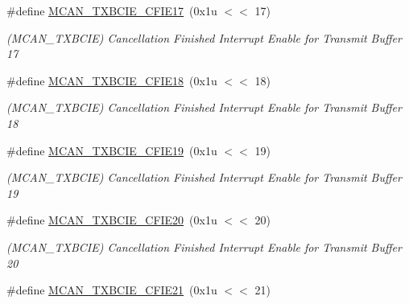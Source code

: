 \begin{DoxyCompactItemize}
\#define \mbox{\hyperlink{group__SAME70__MCAN_ga1066c22367c2c2d2e4db5fdca542deed}{M\+C\+A\+N\+\_\+\+T\+X\+B\+C\+I\+E\+\_\+\+C\+F\+I\+E17}}~(0x1u $<$$<$ 17)
\begin{DoxyCompactList}\small\item\em (M\+C\+A\+N\+\_\+\+T\+X\+B\+C\+IE) Cancellation Finished Interrupt Enable for Transmit Buffer 17 \end{DoxyCompactList}\item 
\mbox{\label{group__SAME70__MCAN_gadab5a0adcf501882f805123262d7d1a0}} 
\#define \mbox{\hyperlink{group__SAME70__MCAN_gadab5a0adcf501882f805123262d7d1a0}{M\+C\+A\+N\+\_\+\+T\+X\+B\+C\+I\+E\+\_\+\+C\+F\+I\+E18}}~(0x1u $<$$<$ 18)
\begin{DoxyCompactList}\small\item\em (M\+C\+A\+N\+\_\+\+T\+X\+B\+C\+IE) Cancellation Finished Interrupt Enable for Transmit Buffer 18 \end{DoxyCompactList}\item 
\mbox{\label{group__SAME70__MCAN_gab46f135f2e6728e3cbd99f2f67a4f51d}} 
\#define \mbox{\hyperlink{group__SAME70__MCAN_gab46f135f2e6728e3cbd99f2f67a4f51d}{M\+C\+A\+N\+\_\+\+T\+X\+B\+C\+I\+E\+\_\+\+C\+F\+I\+E19}}~(0x1u $<$$<$ 19)
\begin{DoxyCompactList}\small\item\em (M\+C\+A\+N\+\_\+\+T\+X\+B\+C\+IE) Cancellation Finished Interrupt Enable for Transmit Buffer 19 \end{DoxyCompactList}\item 
\mbox{\label{group__SAME70__MCAN_ga68e1f5196c38e4de4f50e2e2e39d665f}} 
\#define \mbox{\hyperlink{group__SAME70__MCAN_ga68e1f5196c38e4de4f50e2e2e39d665f}{M\+C\+A\+N\+\_\+\+T\+X\+B\+C\+I\+E\+\_\+\+C\+F\+I\+E20}}~(0x1u $<$$<$ 20)
\begin{DoxyCompactList}\small\item\em (M\+C\+A\+N\+\_\+\+T\+X\+B\+C\+IE) Cancellation Finished Interrupt Enable for Transmit Buffer 20 \end{DoxyCompactList}\item 
\mbox{\label{group__SAME70__MCAN_gaac49dadbfbf557c0529a0baa739c9501}} 
\#define \mbox{\hyperlink{group__SAME70__MCAN_gaac49dadbfbf557c0529a0baa739c9501}{M\+C\+A\+N\+\_\+\+T\+X\+B\+C\+I\+E\+\_\+\+C\+F\+I\+E21}}~(0x1u $<$$<$ 21)
$$
\end{DoxyCompactItemize}
